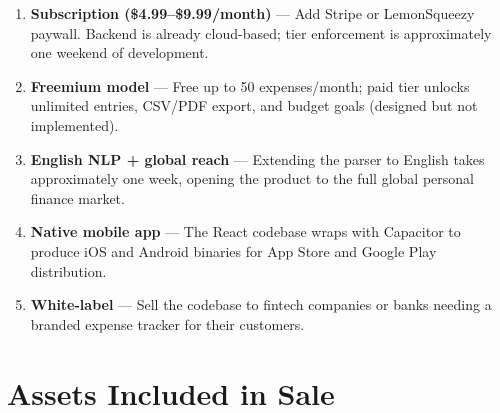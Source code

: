\documentclass[a4paper,10pt]{article}
\begin{document}
\begin{tcolorbox}[orangebox]
{\small
\begin{enumerate}[leftmargin=*,itemsep=3pt,parsep=0pt,topsep=2pt]
  \item \textbf{\color{norange}Subscription (\$4.99--\$9.99/month)} ---
    Add Stripe or LemonSqueezy paywall. Backend is already cloud-based;
    tier enforcement is approximately one weekend of development.

  \item \textbf{\color{norange}Freemium model} ---
    Free up to 50 expenses/month; paid tier unlocks unlimited entries,
    CSV/PDF export, and budget goals (designed but not implemented).

  \item \textbf{\color{norange}English NLP + global reach} ---
    Extending the parser to English takes approximately one week,
    opening the product to the full global personal finance market.

  \item \textbf{\color{norange}Native mobile app} ---
    The React codebase wraps with Capacitor to produce iOS and Android
    binaries for App Store and Google Play distribution.

  \item \textbf{\color{norange}White-label} ---
    Sell the codebase to fintech companies or banks needing a branded
    expense tracker for their customers.
\end{enumerate}
}
\end{tcolorbox}

\vspace{4pt}

\section{Assets Included in Sale}
\end{document}
